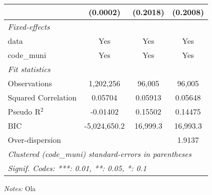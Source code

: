 \documentclass[
]{article}
\begin{document}
\begin{tabular}{lccc}
  &(0.0002) & (0.2018) & (0.2008)\\
\midrule \emph{Fixed-effects}&   &   &  \\
data & Yes & Yes & Yes\\
code\_muni & Yes & Yes & Yes\\
\midrule \emph{Fit statistics}&  & & \\
Observations & 1,202,256&96,005&96,005\\
Squared Correlation & 0.05704&0.05913&0.05648\\
Pseudo R$^2$ & -0.01402&0.15502&0.14475\\
BIC & -5,024,650.2&16,999.3&16,993.3\\
Over-dispersion & &&1.9137\\
\midrule\midrule\multicolumn{4}{l}{\emph{Clustered (code\_muni) standard-errors in parentheses}}\\
\multicolumn{4}{l}{\emph{Signif. Codes: ***: 0.01, **: 0.05, *: 0.1}}\\
\end{tabular}

\medskip \emph{Notes:} Ola
\end{document}
